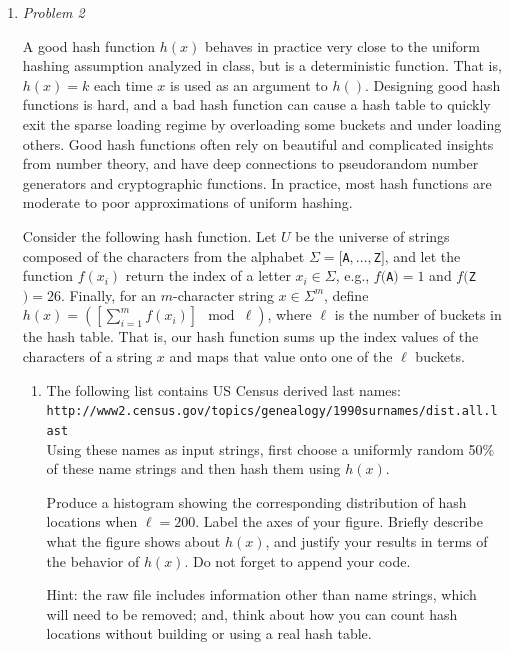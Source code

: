 \documentclass[12pt]{article}
\begin{document}
\begin{enumerate}
\begin{enumerate}
    \end{enumerate}
    
    \newpage

    \item \textit{Problem 2}

    A good hash function $h(x)$ behaves in practice very close to the uniform hashing assumption analyzed in class, but is a deterministic function. That is, $h(x)=k$ each time $x$ is used as an argument to $h()$. Designing good hash functions is hard, and a bad hash function can cause a hash table to quickly exit the sparse loading regime by overloading some buckets and under loading others. Good hash functions often rely on beautiful and complicated insights from number theory, and have deep connections to pseudorandom number generators and cryptographic functions. In practice, most hash functions are moderate to poor approximations of uniform hashing.
	
	\smallskip Consider the following hash function. Let $U$ be the universe of strings composed of the characters from the alphabet $\Sigma=[${\tt A}$,\dots,${\tt Z}$]$, and let the function $f(x_{i})$ return the index of a letter $x_{i}\in \Sigma$, e.g., $f(${\tt A}$)=1$ and $f(${\tt Z}$)=26$. Finally, for an $m$-character string $x\in \Sigma^{m}$, define $h(x) = \left(\left[\sum_{i=1}^{m}f(x_{i})\right]\!\! \mod \ell\right)$, where $\ell$ is the number of buckets in the hash table. That is, our hash function sums up the index values of the characters of a string $x$ and maps that value onto one of the $\ell$ buckets.\\
    
    \begin{enumerate}
        \item 
        
        The following list contains US Census derived last names: \\
    	{\tt http://www2.census.gov/topics/genealogy/1990surnames/dist.all.last} \\
    	Using these names as input strings, first choose a uniformly random 50\% of these name strings and then hash them using $h(x)$.
    	
    	Produce a histogram showing the corresponding distribution of hash locations when $\ell=200$. Label the axes of your figure. Briefly describe what the figure shows about $h(x)$, and justify your results in terms of the behavior of $h(x)$. Do not forget to append your code.
    	 
    	{\footnotesize Hint: the raw file includes information other than name strings, which will need to be removed; and, think about how you can count hash locations without building or using a real hash table.}\\
        

\end{enumerate}
\end{enumerate}
\end{document}
